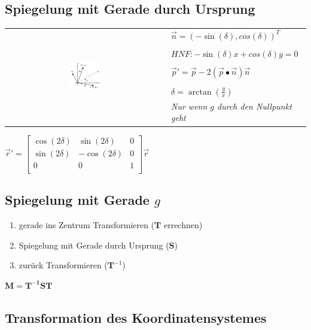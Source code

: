 \subsection{Spiegelung mit Gerade durch Ursprung}

\begin{tabular}{cl}
    \multirow{8}{*}{
        \includegraphics[width=0.2\textwidth]{assets/mirror-on-line.png}
    } & $\vec{n} = (-\sin(\delta), cos(\delta))^T$ \\
    & \\
    & $HNF: -\sin(\delta)x + cos(\delta)y = 0$\\
    & \\
    & $\vec{p}' = \vec{p} - 2 (\vec{p} \bullet \vec{n}) \vec{n}$\\
    & \\
    & $\delta = \arctan(\frac{y}{x})$ \\
    & \textit{Nur wenn $g$ durch den Nullpunkt geht}\\
\end{tabular}

$\vec{r}' = \left[\begin{array}{cc|c}
    \cos(2\delta) & \sin(2\delta) & 0 \\
    \sin(2\delta) & -\cos(2\delta) & 0 \\
    \hline
    0 & 0 & 1 \\
\end{array}\right] \vec{r}$

\subsection{Spiegelung mit Gerade $g$}

\begin{enumerate}
    \item gerade ins Zentrum Transformieren ($\mathbf{T}$ errechnen)
    \item Spiegelung mit Gerade durch Ursprung ($\mathbf{S}$)
    \item zurück Transformieren ($\mathbf{T}^{-1}$)
\end{enumerate}

$\mathbf{M} = \mathbf{T^{-1}ST}$

\subsection{Transformation des Koordinatensystemes}

